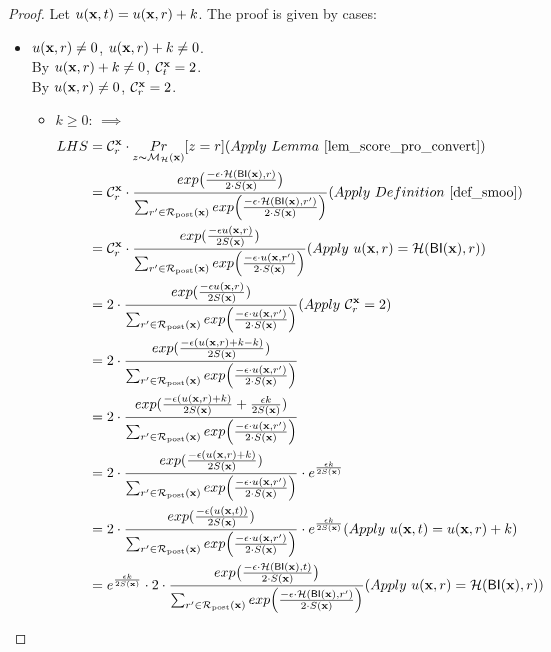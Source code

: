\documentclass{article}
\begin{document}
\begin{proof}
Let $u(\textbf{x}, {t}) = u(\textbf{x}, {r}) + k$. The proof is given by cases:
\begin{itemize}
  \item {\boldmath$u(\textbf{x}, {r}) \neq 0$, $u(\textbf{x}, {r}) + k \neq 0$}.  \\
  By $u(\textbf{x}, {r}) + k \neq 0$, $\mathcal{C}^{\textbf{x}}_{t} = 2$. \\
  By $u(\textbf{x}, {r}) \neq 0 $, $\mathcal{C}^{\textbf{x}}_{r} = 2$. 
  \begin{itemize}
    \item  $k \geq 0$: $\implies$
      \begin{equation*}
      \begin{split}
      LHS 
      & = \cardinality{\dataobs}{r} \cdot \hexpmechPr{\dataobs}{z = r}     (Apply\ Lemma\ \ref{lem_score_pro_convert})\\
      & = \cardinality{\dataobs}{r} \cdot \frac {exp\big(\frac{-\epsilon\cdot\hellinger(\bysinfer(\dataobs),r)}{2\cdot S(\dataobs)}\big)}{\nomalizer{\dataobs}} 
      (Apply\ Definition\ \ref{def_smoo})\\
      & = \cardinality{\dataobs}{r} \cdot \frac{exp(\frac{-\epsilon \ux{r}}{2 S(\dataobs)})}{\unomalizer{\dataobs}}
      (Apply\ \ux{r} = \hellinger(\bysinfer(\dataobs), r))\\
      & = 2 \cdot \frac{exp(\frac{-\epsilon \ux{r}}{2 S(\dataobs)})}{\unomalizer{\dataobs}}                  (Apply\ \cardinality{\dataobs}{r} = 2)\\
      & = 2 \cdot \frac{exp(\frac{-\epsilon (\ux{r} + k - k)}{2 S(\dataobs)})}{\unomalizer{\dataobs}}\\
      & = 2 \cdot \frac{exp(\frac{-\epsilon (\ux{r} + k)}{2 S(\dataobs)} + \frac{\epsilon k}{2 S(\dataobs)})}{\unomalizer{\dataobs}}\\
      & = 2 \cdot \frac{exp(\frac{-\epsilon (\ux{r} + k)}{2 S(\dataobs)})}{\unomalizer{\dataobs}} \cdot e^{\frac{\epsilon k}{2 S(\dataobs)}}\\
      & = 2 \cdot \frac{exp(\frac{-\epsilon (\ux{t})}{2 S(\dataobs)})}{\unomalizer{\dataobs}} \cdot e^{\frac{\epsilon k}{2 S(\dataobs)}}  (Apply \ \ux{t} = \ux{r} + k)\\
      & = e^{\frac{\epsilon k}{2 S(\dataobs)}} \cdot 2 \cdot \frac {exp\big(\frac{-\epsilon\cdot\hellinger(\bysinfer(\dataobs), t)}{2\cdot S(\dataobs)}\big)}{\nomalizer{\dataobs}} 
      (Apply\ \ux{r} = \hellinger(\bysinfer(\dataobs), r))\\

\end{split}
\end{equation*}
\end{itemize}
\end{itemize}
\end{proof}
\end{document}
